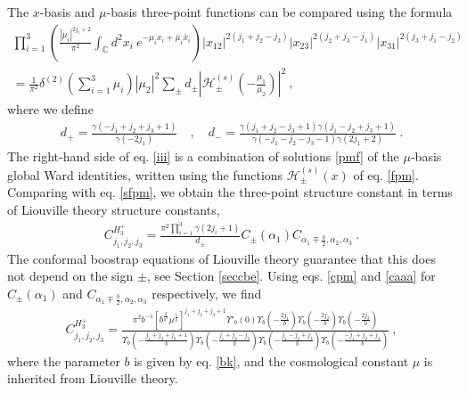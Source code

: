 \documentclass[12pt,a4paper,notitlepage]{report}
\numberwithin{equation}{section}
\theoremstyle{break}
\begin{document}
The $x$-basis and $\mu$-basis three-point functions can be compared using the formula \cite{rt05}
\begin{multline}
 \prod_{i=1}^3\left(\frac{|\mu_i|^{2j_i+2}}{\pi^2}\int_{{\mathbb{C}}}d^2x_i\ e^{-\mu_ix_i+\bar{\mu}_i\bar{x}_i}\right)
|x_{12}|^{2(j_1+j_2-j_3)} |x_{23}|^{2(j_2+j_3-j_1)} |x_{31}|^{2(j_3+j_1-j_2)} 
\\
= \frac{1}{\pi^2}\delta^{(2)}(\textstyle{\sum}_{i=1}^3\mu_i)|\mu_2|^2 \sum_\pm d_\pm \left|\mathcal{H}^{(s)}_\pm(-\tfrac{\mu_1}{\mu_2})\right|^2 \ ,
\label{iii}
\end{multline}
where we define 
\begin{align}
 d_+ = \frac{\gamma(-j_1+j_2+j_3+1)}{\gamma(-2j_1)} \quad , \quad d_- = \frac{\gamma(j_1+j_2-j_3+1)\gamma(j_1-j_2+j_3+1)}{\gamma(-j_1-j_2-j_3-1)\gamma(2j_1+2)}\ .
\end{align}
The right-hand side of eq. \eqref{iii} is a combination of solutions \eqref{pmf} of the $\mu$-basis global Ward identities, written using the functions $\mathcal{H}^{(s)}_\pm(x)$ of eq. \eqref{fpm}.
Comparing with eq. \eqref{sfpm}, we obtain the three-point structure constant in terms of Liouville theory structure constants,
\begin{align}
 C^{H_3^+}_{j_1,j_2,j_3} = \frac{\pi^2\prod_{i=1}^3\gamma(2j_i+1)}{d_\pm}C_{\pm}(\alpha_1)C_{\alpha_1\mp \frac{b}{2},\alpha_2,\alpha_3}\ .
\end{align}
The conformal boostrap equations of Liouville theory guarantee that this does not depend on the sign $\pm$, see Section \ref{seccbe}.
Using eqs. \eqref{cpm} and \eqref{caaa} for $C_{\pm}(\alpha_1)$ and $C_{\alpha_1\mp \frac{b}{2},\alpha_2,\alpha_3}$ respectively, we find
\begin{align}
\boxed{C^{H_3^+}_{j_1,j_2,j_3} = \frac{\pi^2b^{-1}\left[b^{\frac{2}{b^2}}\mu^{\frac{1}{b}}\right]^{j_1+j_2+j_3+1} \Upsilon'_b(0)\Upsilon_b(-\frac{2j_1}{b})\Upsilon_b(-\frac{2j_2}{b})\Upsilon_b(-\frac{2j_3}{b})}
{\Upsilon_b(-\frac{j_1+j_2+j_3+1}{b})\Upsilon_b(-\frac{j_1+j_2-j_3}{b}) \Upsilon_b(-\frac{j_1-j_2+j_3}{b})\Upsilon_b(-\frac{-j_1+j_2+j_3}{b})}}\ ,
\label{chp}
\end{align}
where the parameter $b$ is given by eq. \eqref{bk}, and the cosmological constant $\mu$ is inherited from Liouville theory.
\end{document}
